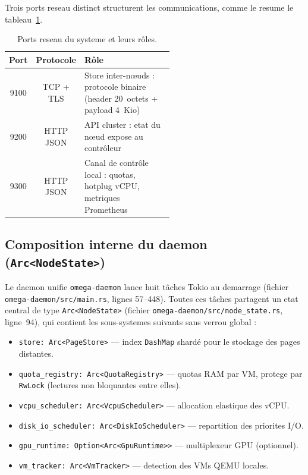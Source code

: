 Trois ports reseau distinct structurent les communications, comme le resume le tableau~\ref{tab:ports-reseau}.

\begin{table}[htbp]
    \centering
    \caption{Ports reseau du systeme et leurs r\^oles.}
    \label{tab:ports-reseau}
    \begin{tabular}{c c p{0.55\linewidth}}
        \toprule
        \textbf{Port} & \textbf{Protocole} & \textbf{R\^ole} \\
        \midrule
        9100 & TCP + TLS & Store inter-n\oe{}uds : protocole binaire (header 20~octets + payload 4~Kio) \\
        9200 & HTTP JSON & API cluster : etat du n\oe{}ud expose au contr\^oleur \\
        9300 & HTTP JSON & Canal de contr\^ole local : quotas, hotplug vCPU, metriques Prometheus \\
        \bottomrule
    \end{tabular}
\end{table}

\subsection{Composition interne du daemon (\texttt{Arc<NodeState>})}
\label{subsec:composition-daemon}

Le daemon unifie \texttt{omega-daemon} lance huit t\^aches Tokio au demarrage (fichier \texttt{omega-daemon/src/main.rs}, lignes 57--448). Toutes ces t\^aches partagent un etat central de type \texttt{Arc<NodeState>} (fichier \texttt{omega-daemon/src/node\_state.rs}, ligne~94), qui contient les sous-systemes suivants sans verrou global :

\begin{itemize}
    \item \texttt{store: Arc<PageStore>} --- index \texttt{DashMap} shard\'e pour le stockage des pages distantes.
    \item \texttt{quota\_registry: Arc<QuotaRegistry>} --- quotas RAM par VM, protege par \texttt{RwLock} (lectures non bloquantes entre elles).
    \item \texttt{vcpu\_scheduler: Arc<VcpuScheduler>} --- allocation elastique des vCPU.
    \item \texttt{disk\_io\_scheduler: Arc<DiskIoScheduler>} --- repartition des priorites I/O.
    \item \texttt{gpu\_runtime: Option<Arc<GpuRuntime>>} --- multiplexeur GPU (optionnel).
    \item \texttt{vm\_tracker: Arc<VmTracker>} --- detection des VMs QEMU locales.
\end{itemize}

